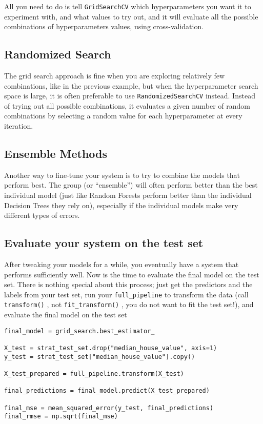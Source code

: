 \documentclass[french]{article}
\begin{document}
All you need to do is tell \lstinline{GridSearchCV} which hyperparameters you want it to experiment with, and what values to try out, and it will evaluate all the possible combinations of hyperparameters values, using cross-validation.

\subsection{Randomized Search}

The grid search approach is fine when you are exploring relatively few combinations, like in the previous example, but when the hyperparameter search space is large, it is often preferable to use \lstinline{RandomizedSearchCV} instead. Instead of trying out all possible combinations, it evaluates a given number of random combinations by selecting a random value for each hyperparameter at every iteration.

\subsection{Ensemble Methods}

Another way to fine-tune your system is to try to combine the models that perform best. The group (or “ensemble”) will often perform better than the best individual model (just like Random Forests perform better than the individual Decision Trees they rely on), especially if the individual models make very different types of errors.  


\subsection{Evaluate your system on the test set}
After tweaking your models for a while, you eventually have a system that performs sufficiently well. Now is the time to evaluate the final model on the test set. There is nothing special about this process; just get the predictors and the labels from your test set, run your \lstinline{full_pipeline} to transform the data (call \lstinline{transform()} , not \lstinline{fit_transform()} , you do not want to fit the test set!), and evaluate the final model on the test set

\begin{lstlisting}
final_model = grid_search.best_estimator_

X_test = strat_test_set.drop("median_house_value", axis=1)
y_test = strat_test_set["median_house_value"].copy()

X_test_prepared = full_pipeline.transform(X_test)

final_predictions = final_model.predict(X_test_prepared)

final_mse = mean_squared_error(y_test, final_predictions)
final_rmse = np.sqrt(final_mse)
\end{lstlisting}
\end{document}
